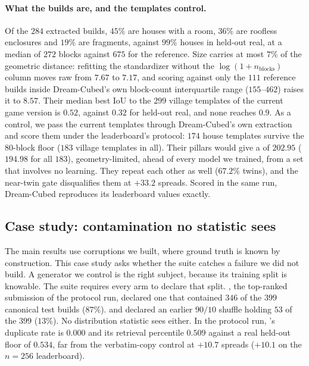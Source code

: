 \paragraph{What the builds are, and the templates control.} Of the $284$ extracted
builds, $45\%$ are houses with a room, $36\%$ are roofless enclosures and $19\%$ are
fragments, against $99\%$ houses in held-out real, at a median of $272$ blocks against
$675$ for the reference. Size carries at most $7\%$ of the geometric distance:
refitting the standardizer without the $\log(1+n_{\text{blocks}})$ column moves raw
\vkid{} from $7.67$ to $7.17$, and scoring against only the $111$ reference builds inside
Dream-Cubed's own block-count interquartile range ($155$--$462$) raises it to $8.57$. Their
median best IoU to the $299$ village templates of the current game version is $0.52$,
against $0.32$ for held-out real, and none reaches $0.9$. As a control, we pass the current
templates through Dream-Cubed's own extraction and score them under the leaderboard's
protocol: $174$ house templates survive the $80$-block floor ($183$ village templates in
all). Their pillars would give a \blockscore{} of $202.95$ ($194.98$ for all $183$),
geometry-limited, ahead of every model we trained, from a set that involves no learning.
They repeat each other as well ($67.2\%$ twins), and the near-twin gate disqualifies them
at $+33.2$ spreads. Scored in the same run, Dream-Cubed reproduces its leaderboard values
exactly.

\subsection{Case study: contamination no statistic sees}
\label{app:casestudy}

The main results use corruptions we built, where ground truth is known by construction.
This case study asks whether the suite catches a failure we did not build. A generator we
control is the right subject, because its training split is knowable. The suite requires
every arm to declare that split. \voxar{}, the top-ranked submission of the protocol run,
declared one that contained $346$ of the $399$ canonical test builds ($87\%$). \llmft{} and
\llmgeo{} declared an earlier $90/10$ shuffle holding $53$ of the $399$ ($13\%$). No
distribution statistic sees either. In the protocol run, \voxar{}'s duplicate rate is $0.000$ and its retrieval
percentile $0.509$ against a real held-out floor of $0.534$, far from the verbatim-copy
control at $+10.7$ spreads ($+10.1$ on the $n{=}256$ leaderboard).

